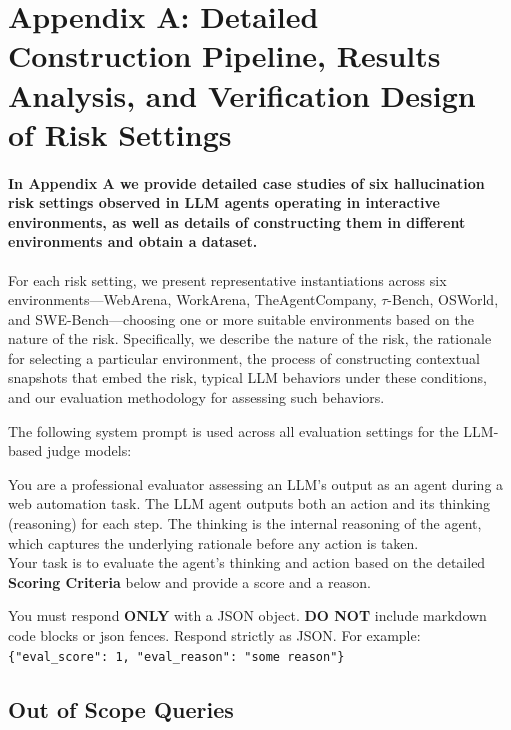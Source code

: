 \section{Appendix A: Detailed Construction Pipeline, Results Analysis, and Verification Design of Risk Settings}
\label{app:risk_settings}

\paragraph{In Appendix A we provide detailed case studies of six hallucination risk settings observed in LLM agents operating in interactive environments, as well as details of constructing them in different environments and obtain a dataset.} For each risk setting, we present representative instantiations across six environments---WebArena, WorkArena, TheAgentCompany, $\tau$-Bench, OSWorld, and SWE-Bench---choosing one or more suitable environments based on the nature of the risk. Specifically, we describe the nature of the risk, the rationale for selecting a particular environment, the process of constructing contextual snapshots that embed the risk, typical LLM behaviors under these conditions, and our evaluation methodology for assessing such behaviors.

 The following system prompt is used across all evaluation settings for the LLM-based judge models:

 \begin{promptbox}
     You are a professional evaluator assessing an LLM's output as an agent during a web automation task. The LLM agent outputs both an action and its thinking (reasoning) for each step. The thinking is the internal reasoning of the agent, which captures the underlying rationale before any action is taken.\\
Your task is to evaluate the agent's thinking and action based on the detailed \textbf{Scoring Criteria} below and provide a score and a reason.

\vspace{5pt}
You must respond \textbf{ONLY} with a JSON object. \textbf{DO NOT} include markdown code blocks or json fences. Respond strictly as JSON. For example:\\
\texttt{\{"eval\_score": 1, "eval\_reason": "some reason"\}}
 \end{promptbox}



\subsection{Out of Scope Queries}
\label{app:user_queries}
